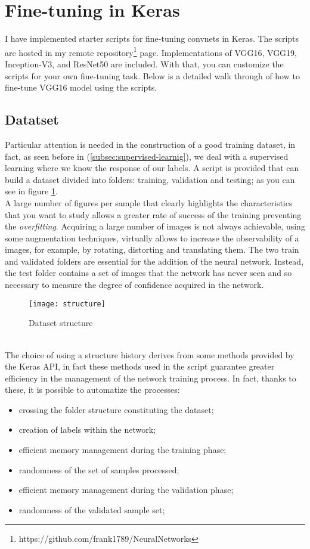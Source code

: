 \section{Fine-tuning in Keras}
\label{sec:finetuningkeras}
%
I have implemented starter scripts for fine-tuning convnets in Keras. 
The scripts are hosted in my remote 
repository\footnote{https://github.com/frank1789/NeuralNetworks} page.
Implementations of VGG16, VGG19, Inception-V3, and ResNet50 are included. 
With that, you can customize the scripts for your own fine-tuning task.
Below is a detailed walk through of how to fine-tune VGG16 model using the 
scripts.
%
\subsection{Datatset}
\label{subsec:dataset}
Particular attention is needed in the construction of a good training dataset, 
in fact, as seen before in (\ref{subsec:supervised-learnig}), we deal with a 
supervised learning where we know the response of our labels.
A script is provided that can build a dataset divided into folders: training, 
validation and testing; as you can see in figure \ref{fig:datasetstructure}.\\
A large number of figures per sample that clearly highlights the characteristics 
that you want to study allows a greater rate of success of the training 
preventing the \emph{overfitting}.
Acquiring a large number of images is not always achievable, using some 
augmentation techniques, virtually allows to increase the observability of a 
images, for example, by rotating, distorting and translating them.
The two train and validated folders are essential for the addition of the 
neural network.
Instead, the test folder contains a set of images that the network has never 
seen and so necessary to measure the degree of confidence acquired in the network.\linebreak
%
\begin{figure}[htb]
\centering
\texttt{[image: structure]}
\caption{Dataset structure}
\label{fig:datasetstructure}
\end{figure}
%
\\\noindent The choice of using a structure history derives from some methods provided by 
the Keras API, in fact these methods used in the script guarantee greater 
efficiency in the management of the network training process.
In fact, thanks to these, it is possible to automatize the processes:
\begin{itemize}
\item crossing the folder structure constituting the dataset;
\item creation of labels within the network;
\item efficient memory management during the training phase;
\item randomness of the set of samples processed;
\item efficient memory management during the validation phase;
\item randomness of the validated sample set;
\end{itemize}
%
